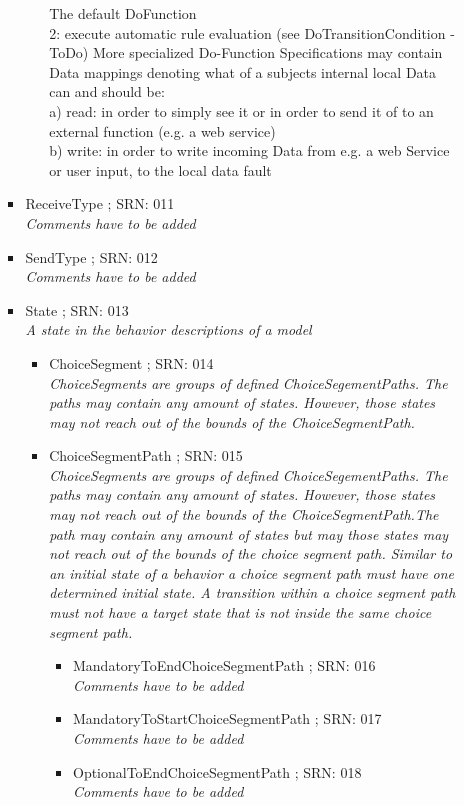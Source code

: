 \begin{itemize}
\begin{itemize}
\begin{itemize}
\begin{itemize}
{			The default DoFunction \\2: execute automatic rule evaluation (see DoTransitionCondition - ToDo)
			More specialized Do-Function Specifications may contain Data mappings denoting what of a subjects internal local Data can and should be:\\
			a) read: in order to simply see it or in order to send it of to an external function (e.g. a web service)\\
			b) write: in order to write incoming Data from e.g. a web Service or user input, to the local data fault}
		\end{itemize}
		\item ReceiveType ; SRN: 011 \\ \textit{Comments have to be added}
		\item SendType ; SRN: 012 \\ \textit{Comments have to be added}
		\item State ; SRN: 013 \\ \textit{A state in the behavior descriptions of a model}
		\begin{itemize}
			\item ChoiceSegment ; SRN: 014 \\ \textit{ChoiceSegments are groups of defined ChoiceSegementPaths. The paths may contain any amount of states. However, those states may not reach out of the bounds of the ChoiceSegmentPath.}
			\item ChoiceSegmentPath ; SRN: 015 \\ \textit{ChoiceSegments are groups of defined ChoiceSegementPaths. The paths may contain any amount of states. However, those states may not reach out of the bounds of the ChoiceSegmentPath.The path may contain any amount of states but may those states may not reach out of the bounds of the choice segment path. Similar to an initial state of a behavior a choice segment path must have one determined initial state. A transition within a choice segment path must not have a target state that is not inside the same choice segment path.}
			\begin{itemize}
				\item MandatoryToEndChoiceSegmentPath ; SRN: 016 \\ \textit{Comments have to be added}
				\item MandatoryToStartChoiceSegmentPath ; SRN: 017 \\ \textit{Comments have to be added}
				\item OptionalToEndChoiceSegmentPath ; SRN: 018 \\ \textit{Comments have to be added}

\end{itemize}
\end{itemize}
\end{itemize}
\end{itemize}
\end{itemize}

